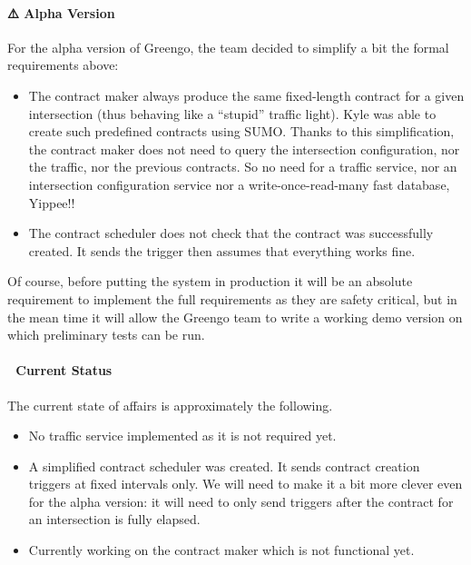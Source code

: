 \documentclass[letterpaper,10pt,english]{sphinxmanual}
\begin{document}
\paragraph{⚠️ Alpha Version}
\label{\detokenize{blog/2020/01/contract_maker_vs_contract_scheduler:alpha-version}}
For the alpha version of Greengo, the team decided to simplify a bit the formal requirements above:
\begin{itemize}
\item {} 
The contract maker always produce the same fixed-length contract for a given intersection (thus behaving like a “stupid” traffic light). Kyle was able to create such predefined contracts using SUMO. Thanks to this simplification, the contract maker does not need to query the intersection configuration, nor the traffic, nor the previous contracts. So no need for a traffic service, nor an intersection configuration service nor a write-once-read-many fast database, Yippee!!

\item {} 
The contract scheduler does not check that the contract was successfully created. It sends the trigger then assumes that everything works fine.

\end{itemize}

Of course, before putting the system in production it will be an absolute requirement to implement the full requirements as they are safety critical, but in the mean time it will allow the Greengo team to write a working demo version on which preliminary tests can be run.


\paragraph{🔨 Current Status}
\label{\detokenize{blog/2020/01/contract_maker_vs_contract_scheduler:current-status}}
The current state of affairs is approximately the following.
\begin{itemize}
\item {} 
No traffic service implemented as it is not required yet.

\item {} 
A simplified contract scheduler was created. It sends contract creation triggers at fixed intervals only. We will need to make it a bit more clever even for the alpha version: it will need to only send triggers after the contract for an intersection is fully elapsed.

\item {} 
Currently working on the contract maker which is not functional yet.

\end{itemize}
\end{document}
